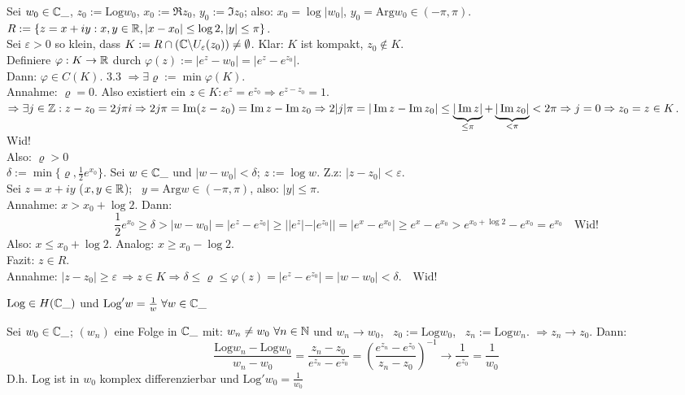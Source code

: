 \documentclass[a4paper,twoside,DIV15,BCOR12mm]{scrbook}
\def\Arg{\text{Arg}}
\def\Log{\text{Log}}
\begin{document}
\begin{beweis}
Sei $w_0 \in \mathbb{C}\_$,
$z_0 := \Log w_0$, $x_0 := \Re z_0$, $y_0:=\Im z_0$; also: $x_0 = \log |w_0|$,
$y_0 = \Arg w_0 \in (-\pi,\pi)$. $R:= \{ z= x+iy: x,y \in \mathbb{R}, |x-x_0| \leq \log 2, |y| \leq  \pi \}$.\\
Sei $\varepsilon > 0$ so klein, dass $K:= R \cap \left( \mathbb{C} \backslash U_{\varepsilon}(z_0)\right) \not= \emptyset$. \; Klar: $K$ ist kompakt, $z_0 \notin K$.\\
Definiere $\varphi: K \rightarrow \mathbb{R}$ durch $\varphi(z):= |e^z - w_0| = |e^z - e^{z_0}|$.\\
Dann: $\varphi \in C(K)$. 3.3 $\Rightarrow \exists \varrho := \min \varphi(K)$. \\
Annahme: $\varrho = 0$. Also existiert ein $z \in K: e^z = e^{z_0} \Rightarrow e^{z-z_0}=1$.  $\Rightarrow \exists j \in \mathbb{Z}: z-z_0 = 2j\pi i \Rightarrow 2j\pi = \mathop{\rm Im}\nolimits(z-z_0) = \mathop{\rm Im}\nolimits z - \mathop{\rm Im}\nolimits z_0 \Rightarrow 2|j|\pi = |\mathop{\rm Im}\nolimits z - \mathop{\rm Im}\nolimits z_0| \leq \underbrace{|\mathop{\rm Im}\nolimits z|}_{\leq \pi} + \underbrace{|\mathop{\rm Im}\nolimits z_0|}_{< \pi} < 2\pi \Rightarrow j = 0 \Rightarrow z_0 = z \in K$. Wid!\\
Also: $\varrho > 0$\\
$\delta := \min\{ \varrho, \frac{1}{2}e^{x_0}\}$. Sei $w \in \mathbb{C}\_$ und $|w-w_0| < \delta$; \; $z:=\log w$. \; Z.z: $|z-z_0|<\varepsilon$. \\
Sei $z=x+iy$ ($x,y \in \mathbb{R}$); \, $y = \Arg w \in (-\pi,\pi)$, also: $|y| \leq \pi$. \\
Annahme: $x>x_0 + \log 2$. Dann:\\
\[
\frac{1}{2} e^{x_0} \geq \delta > |w-w_0| = |e^z - e^{z_0}| \geq | |e^z| - |e^{z_0}| | = |e^x - e^{x_0}| \geq e^x - e^{x_0} > e^{x_0 + \log 2} - e^{x_0} = e^{x_0} \quad \mbox{Wid!}
\]
Also: $x \leq x_0 + \log 2$. Analog: $x \geq x_0 - \log 2.$ \\
Fazit: $z\in R.$\\
Annahme: $|z-z_0| \geq \varepsilon \, \Rightarrow z\in K \Rightarrow \delta \leq \varrho \leq \varphi(z) = |e^z - e^{z_0}| = |w-w_0| < \delta. \quad \mbox{Wid!}$
\end{beweis}

\begin{satz}
$\Log \in H(\MdC\_)$ und $\Log'w= \frac1w \; \forall w \in \MdC\_$
\end{satz}

\begin{beweis}
Sei $w_0 \in \mathbb{C}\_$; $(w_n)$ eine Folge in $\mathbb{C}\_$ mit: $w_n \not= w_0 \ \forall n \in \mathbb{N}$ und $w_n \rightarrow w_0$, \, $z_0 := \Log w_0$, \, $z_n:=\Log w_n$.  $\Rightarrow z_n \rightarrow z_0$. Dann:\\
\[
\frac{\Log w_n - \Log w_0}{w_n - w_0} = \frac{z_n-z_0}{e^{z_n}-e^{z_0}} = \left(\frac{e^{z_n}-e^{z_0}}{z_n -z_0}\right)^{-1} \rightarrow \frac1{e^{z_0}} = \frac1{w_0}
\]
D.h. $\Log$ ist in $w_0$ komplex differenzierbar und $\Log'w_0 = \frac{1}{w_0}$
\end{beweis}
\end{document}
